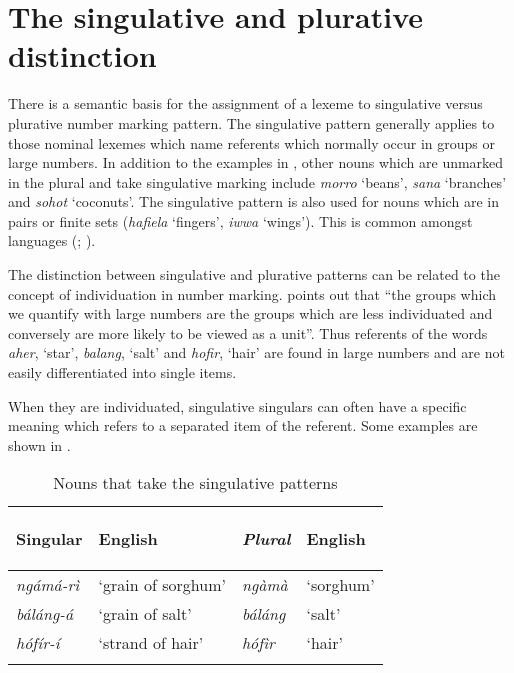 \documentclass[output=paper]{langsci/langscibook}
\begin{document}
\section{The singulative and plurative distinction}\label{sec:moodie:3}

There is a semantic basis for the assignment of a lexeme to singulative versus plurative number marking pattern. The singulative pattern generally applies to those nominal lexemes which name referents which normally occur in groups or large numbers. In addition to the examples in , other nouns which are unmarked in the plural and take singulative marking include \textit{morro} ‘beans’, \textit{sana} ‘branches’ and \textit{sohot} ‘coconuts’. The singulative pattern is also used for nouns which are in pairs or finite sets (\textit{hafiela} ‘fingers’, \textit{iwwa} ‘wings’). This is common amongst  languages (\citealt[216]{Dimmendaal2000}; \citealt[119]{Creisselsetal2008}).

The distinction between singulative and plurative patterns can be related to the concept of individuation in number marking. \citet[217]{Corbett2000} points out that “the groups which we quantify with large numbers are the groups which are less individuated and conversely are more likely to be viewed as a unit”. Thus referents of the  words \textit{aher}, ‘star’, \textit{balang}, ‘salt’ and \textit{hofir}, ‘hair’ are found in large numbers and are not easily differentiated into single items.

When they are individuated, singulative singulars can often have a specific meaning which refers to a separated item of the referent.  Some examples are shown in . 

\begin{table}
\begin{tabularx}{\textwidth}{>{\itshape}Xl>{\itshape}XX}
\lsptoprule

  \textup{Singular} &   {English} &   \textup{Plural} &   {English}\\ 
\midrule
 ngámá-rì &  ‘grain of sorghum’ &  ngàmà &  ‘sorghum’\\
 báláng-á &  ‘grain of salt’ &  báláng &  ‘salt’\\
 hófír-í &  ‘strand of hair’ &  hófìr &  ‘hair’\\
\lspbottomrule
\end{tabularx}
\caption{Nouns that take the singulative patterns}
\label{tab:moodie:6}
\end{table}
\end{document}
